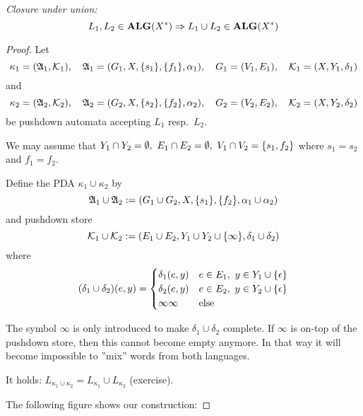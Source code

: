 {\em Closure under union:}
\[ L_1, L_2 \in \mbox{{\bf ALG}}(X^*) \Rightarrow L_1 \cup L_2 \in \mbox{{\bf ALG}}(X^*) \]
\begin{proof}
Let
\[ \kappa_1 = (\mbox{$\mathfrak{A}$}_1,\mbox{$\mathcal{K}$}_1),\quad \mbox{$\mathfrak{A}$}_1 = (G_1, X,
\mbox{$\{s_1\}$}, \mbox{$\{f_1\}$}, \alpha_1),\quad G_1 = (V_1, E_1),\quad \mbox{$\mathcal{K}$}_1 =
(X, Y_1, \delta_1)
\]
and
\[ \kappa_2 = (\mbox{$\mathfrak{A}$}_2,\mbox{$\mathcal{K}$}_2),\quad \mbox{$\mathfrak{A}$}_2 = (G_2, X,
\mbox{$\{s_2\}$}, \mbox{$\{f_2\}$}, \alpha_2),\quad G_2 = (V_2, E_2),\quad \mbox{$\mathcal{K}$}_2 =
(X, Y_2, \delta_2)
\]
be pushdown automata accepting $L_1$ resp.\ $L_2$.

We may assume that $Y_1 \cap Y_2 = \emptyset,\ E_1 \cap E_2 =
\emptyset,\ V_1 \cap V_2 = \mbox{$\{s_1, f_2\}$}$ where $s_1 = s_2$ and $f_1 = f_2$.

Define the PDA $\kappa_1 \cup \kappa_2$ by
\[ \mbox{$\mathfrak{A}$}_1 \cup \mbox{$\mathfrak{A}$}_2 := (G_1 \cup G_2, X, \mbox{$\{s_1\}$}, \mbox{$\{f_2\}$},
\alpha_1 \cup \alpha_2) \]
and pushdown store
\[ \mbox{$\mathcal{K}$}_1 \cup \mbox{$\mathcal{K}$}_2 := (E_1 \cup E_2, Y_1 \cup Y_2 \cup
\mbox{$\{\infty\}$}, \delta_1 \cup \delta_2) \]
where
\[ (\delta_1 \cup \delta_2)(e, y) = \begin{cases}
\delta_1(e, y) & e \in E_1,\ y \in Y_1 \cup \mbox{$\{\epsilon\}$} \\ 
\delta_2(e, y) & e \in E_2,\ y \in Y_2 \cup \mbox{$\{\epsilon\}$} \\
\infty\infty & \text{else} 
\end{cases}
\]

The symbol $\infty$ is only introduced to make $\delta_1 \cup \delta_2$
complete. If $\infty$ is on-top of the pushdown store, then this cannot become
empty anymore. In that way it will become impossible to ''mix'' words from both
languages.

It holds: $L_{\kappa_1 \cup \kappa_2} = L_{\kappa_1} \cup L_{\kappa_2}$
(exercise).

The following figure shows our construction:

\missingfigure

\end{proof}

